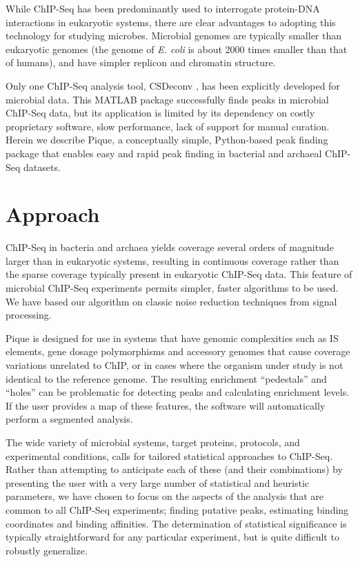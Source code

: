 \documentclass{bioinfo}
\begin{document}
While ChIP-Seq has been predominantly used to interrogate protein-DNA
interactions in eukaryotic systems, there are clear advantages to
adopting this technology for studying microbes. Microbial genomes are
typically smaller than eukaryotic genomes (the genome of {\em E. coli}
is about 2000 times smaller than that of humans), and have simpler
replicon and chromatin structure.

Only one ChIP-Seq analysis tool, CSDeconv \cite{CSDeconv}, has been
explicitly developed for microbial data. This MATLAB package
successfully finds peaks in microbial ChIP-Seq data, but its
application is limited by its dependency on costly proprietary
software, slow performance, lack of support for manual
curation. Herein we describe Pique, a conceptually simple,
Python-based peak finding package that enables easy and rapid peak
finding in bacterial and archaeal ChIP-Seq datasets.

\section{Approach}

\noindent ChIP-Seq in bacteria and archaea yields coverage several
orders of magnitude larger than in eukaryotic systems, resulting in
continuous coverage rather than the sparse coverage typically present
in eukaryotic ChIP-Seq data.  This feature of microbial ChIP-Seq
experiments permits simpler, faster algorithms to be used. We have
based our algorithm on classic noise reduction techniques from signal
processing.

Pique is designed for use in systems that have genomic complexities
such as IS elements, gene dosage polymorphisms and accessory genomes
that cause coverage variations unrelated to ChIP, or in cases where
the organism under study is not identical to the reference genome. The
resulting enrichment ``pedestals'' and ``holes'' can be problematic
for detecting peaks and calculating enrichment levels. If the user
provides a map of these features, the software will automatically
perform a segmented analysis.

The wide variety of microbial systems, target proteins, protocols, and
experimental conditions, calls for tailored statistical approaches to
ChIP-Seq. Rather than attempting to anticipate each of these (and
their combinations) by presenting the user with a very large number of
statistical and heuristic parameters, we have chosen to focus on the
aspects of the analysis that are common to all ChIP-Seq experiments;
finding putative peaks, estimating binding coordinates and binding
affinities. The determination of statistical significance is typically
straightforward for any particular experiment, but is quite difficult
to robustly generalize.
\end{document}
